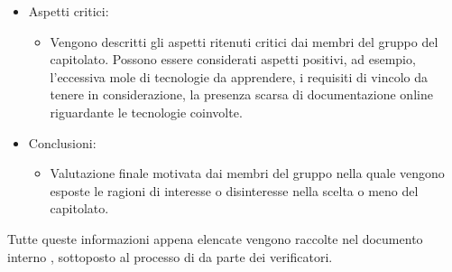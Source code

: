 \begin{itemize}
\begin{itemize}
	\end{itemize}
\item Aspetti critici:
	\begin{itemize}
	\item Vengono descritti gli aspetti ritenuti critici dai membri del gruppo \Gruppo{} del capitolato.
	Possono essere considerati aspetti positivi, ad esempio, l'eccessiva mole di tecnologie da apprendere, i requisiti di vincolo da tenere in considerazione, la presenza scarsa di documentazione online riguardante le tecnologie coinvolte.
	\end{itemize}
\item Conclusioni:
	\begin{itemize}
	\item Valutazione finale motivata dai membri del gruppo \Gruppo{} nella quale vengono esposte le ragioni di interesse o disinteresse nella scelta o meno del capitolato.
	\end{itemize}
\end{itemize}
Tutte queste informazioni appena elencate vengono raccolte nel documento interno \glo{\SdF{}}, sottoposto al processo di  da parte dei verificatori.